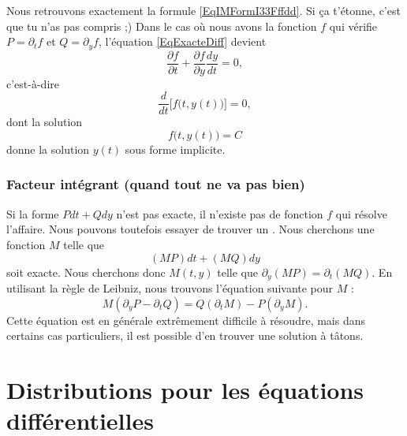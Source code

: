 Nous retrouvons exactement la formule \eqref{EqIMFormI33Fffdd}. Si ça t'étonne, c'est que tu n'as pas compris ;) Dans le cas où nous avons la fonction \( f\) qui vérifie \( P=\partial_tf\) et \( Q=\partial_yf\), l'équation \eqref{EqExacteDiff} devient
\begin{equation}
	\frac{ \partial f }{ \partial t }+\frac{ \partial f }{ \partial y }\frac{ dy }{ dt }=0,
\end{equation}
c'est-à-dire
\begin{equation}
	\frac{ d }{ dt }\Big[ f\big( t,y(t) \big) \Big]=0,
\end{equation}
dont la solution
\begin{equation}
	f\big( t,y(t) \big)=C
\end{equation}
donne la solution \( y(t)\) sous forme implicite.

\subsubsection{Facteur intégrant (quand tout ne va pas bien)}

Si la forme \( Pdt+Qdy\) n'est pas exacte, il n'existe pas de fonction \( f\) qui résolve l'affaire. Nous pouvons toutefois essayer de trouver un . Nous cherchons une fonction \( M\) telle que
\begin{equation}
	(MP)dt+(MQ)dy
\end{equation}
soit exacte. Nous cherchons donc \( M(t,y)\) telle que \( \partial_y(MP)=\partial_t(MQ)\). En utilisant la règle de Leibniz, nous trouvons l'équation suivante pour \( M\) :
\begin{equation}		\label{EqDuFacteurIntegrant}
	M(\partial_yP-\partial_tQ)=Q(\partial_tM)-P(\partial_yM).
\end{equation}
Cette équation est en générale extrêmement difficile à résoudre, mais dans certains cas particuliers, il est possible d'en trouver une solution à tâtons.

\section{Distributions pour les équations différentielles}
\label{SecTNgeNms}

